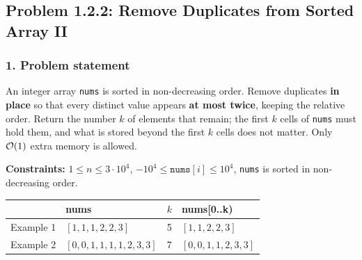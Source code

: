 \subsection{Problem 1.2.2: Remove Duplicates from Sorted Array II}


\subsubsection*{1. Problem statement}

An integer array \texttt{nums} is sorted in non-decreasing order. Remove duplicates \textbf{in place} so that every distinct value appears \textbf{at most twice}, keeping the relative order. Return the number $k$ of elements that remain; the first $k$ cells of \texttt{nums} must hold them, and what is stored beyond the first $k$ cells does not matter. Only $\mathcal{O}(1)$ extra memory is allowed.

\textbf{Constraints:} $1 \le n \le 3\cdot10^4$, \; $-10^4 \le \texttt{nums}[i] \le 10^4$, \; \texttt{nums} is sorted in non-decreasing order.

\begin{table}[H]
\centering\small
\begin{tabular}{@{}llcl@{}}
\toprule
& \textbf{nums} & $k$ & \textbf{nums[0..k)} \\
\midrule
Example 1 & $[1, 1, 1, 2, 2, 3]$ & 5 & $[1, 1, 2, 2, 3]$ \\
Example 2 & $[0, 0, 1, 1, 1, 1, 2, 3, 3]$ & 7 & $[0, 0, 1, 1, 2, 3, 3]$ \\
\bottomrule
\end{tabular}
\end{table}

\begin{diagrambox}
\end{diagrambox}

